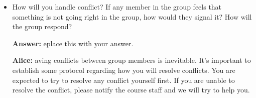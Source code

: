 \documentclass[12pt]{article}
\newenvironment{answer}[1]{
\color{blue}
	{\bf Answer:}
}{
}
\newenvironment{alice}[1]{
\color{magenta}
	{\bf Alice:}
}{
}
\begin{document}
\begin{itemize}
\begin{alice}
Dealing with unexpected situations is one of the most important skills that you will need to develop when working in a group.  Trust me --- with such an open-ended project, there will be surprises.  It is especially important to keep communicating when you are struggling.  The worst way of dealing with a difficult situation is to stop responding to emails and stop attending meetings.  Instead, let your group members know that you are struggling and try to figure out a solution together.
\end{alice}

\item How will you handle conflict? If any member in the group feels that something is not going right in the group, how would they signal it? How will the group respond?

\begin{answer}

Replace this with your answer.
\end{answer}

\begin{alice}

Having conflicts between group members is inevitable.  It's important to establish some protocol regarding how you will resolve conflicts.  You are expected to try to resolve any conflict yourself first.  If you are unable to resolve the conflict, please notify the course staff and we will try to help you.

\end{alice}

\end{itemize}
\end{document}
